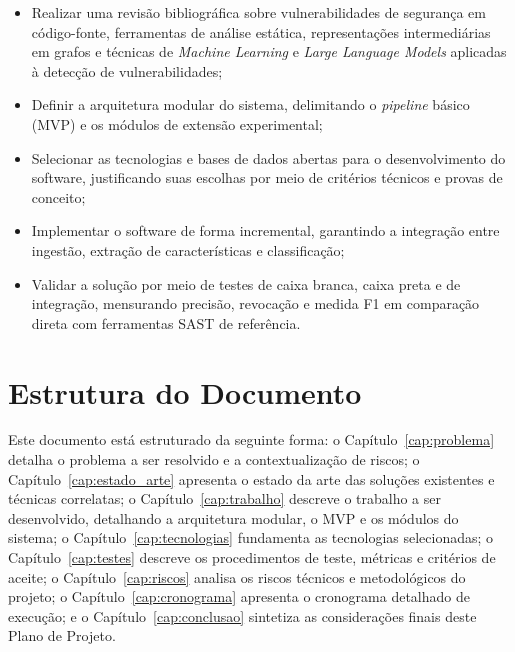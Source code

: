 \begin{itemize}
  \item Realizar uma revisão bibliográfica sobre vulnerabilidades de segurança em código-fonte, ferramentas de análise estática, representações intermediárias em grafos e técnicas de \textit{Machine Learning} e \textit{Large Language Models} aplicadas à detecção de vulnerabilidades;
  \item Definir a arquitetura modular do sistema, delimitando o \textit{pipeline} básico (MVP) e os módulos de extensão experimental;
  \item Selecionar as tecnologias e bases de dados abertas para o desenvolvimento do software, justificando suas escolhas por meio de critérios técnicos e provas de conceito;
  \item Implementar o software de forma incremental, garantindo a integração entre ingestão, extração de características e classificação;
  \item Validar a solução por meio de testes de caixa branca, caixa preta e de integração, mensurando precisão, revocação e medida F1 em comparação direta com ferramentas SAST de referência.
\end{itemize}

\section{Estrutura do Documento}

Este documento está estruturado da seguinte forma: o Capítulo~\ref{cap:problema} detalha o problema a ser resolvido e a contextualização de riscos; o Capítulo~\ref{cap:estado_arte} apresenta o estado da arte das soluções existentes e técnicas correlatas; o Capítulo~\ref{cap:trabalho} descreve o trabalho a ser desenvolvido, detalhando a arquitetura modular, o MVP e os módulos do sistema; o Capítulo~\ref{cap:tecnologias} fundamenta as tecnologias selecionadas; o Capítulo~\ref{cap:testes} descreve os procedimentos de teste, métricas e critérios de aceite; o Capítulo~\ref{cap:riscos} analisa os riscos técnicos e metodológicos do projeto; o Capítulo~\ref{cap:cronograma} apresenta o cronograma detalhado de execução; e o Capítulo~\ref{cap:conclusao} sintetiza as considerações finais deste Plano de Projeto.
